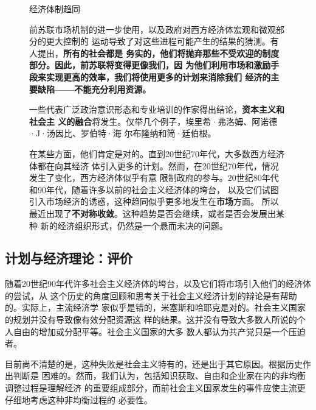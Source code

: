 \begin{figure}[ht]
  \centering
  \begin{mybox}{经济体制趋同}
    \begin{multicols}{2}
      前苏联市场机制的进一步使用，以及政府对西方经济体宏观和微观部分的更大控制的
      运动导致了对这些进程可能产生的结果的猜测。有人提出，\textbf{所有的社会都是
        务实的，他们将抛弃那些不受欢迎的制度部分。因此，前苏联将变得更像我们，因
        为他们利用市场和激励手段来实现更高的效率，我们将使用更多的计划来消除我们
        经济的主要缺陷——不能充分利用资源。}

      一些代表广泛政治意识形态和专业培训的作家得出结论，\textbf{资本主义和社会主
        义的融合}将发生。仅举几个例子，埃里希·弗洛姆、阿诺德·J·汤因比、罗伯特·海
      尔布隆纳和简·廷伯根。

      在某些方面，他们肯定是对的。直到20世纪70年代，大多数西方经济体都在向其经济
      体引入更多的计划。然而，在20世纪70年代，情况发生了变化，西方经济体似乎有意
      限制政府的参与。20世纪80年代和90年代，随着许多以前的社会主义经济体的垮台，
      以及它们试图引入市场经济的诱惑，这种趋同似乎更多地发生在\textbf{市场}方面。
      所以最近出现了\textbf{不对称收敛}。这种趋势是否会继续，或者是否会发展出某种
      新的经济组织形式，仍然是一个悬而未决的问题。
    \end{multicols}
  \end{mybox}
\end{figure}

\subsection{计划与经济理论：评价}

随着20世纪90年代许多社会主义经济体的垮台，以及它们将市场引入他们的经济体的尝试，从
这个历史的角度回顾和思考关于社会主义经济计划的辩论是有帮助的。实际上，主流经济学
家似乎是错的，米塞斯和哈耶克是对的。社会主义国家的规划并没有导致像有效分配资源这
样的结果。这并没有导致大多数人所说的个人自由的增加或分配平等。社会主义国家的大多
数人都认为共产党只是一个压迫者。

目前尚不清楚的是，这种失败是社会主义特有的，还是出于其它原因。根据历史作出判断是
困难的。然而，我们认为，包括知识获取、自由和企业家在内的非均衡调整过程是理解经济
的重要组成部分，而前社会主义国家发生的事件应使主流更仔细地考虑这种非均衡过程的
必要性。


